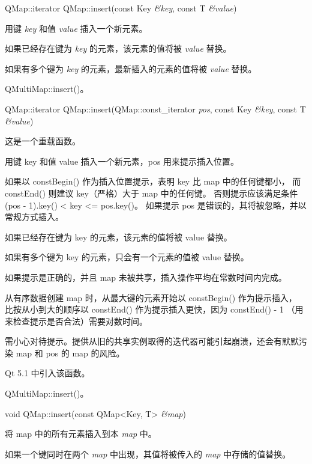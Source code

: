 \splitLine

QMap::iterator QMap::insert(const Key \emph{\&key}, const T \emph{\&value})

用键 \emph{key} 和值 \emph{value} 插入一个新元素。

如果已经存在键为 \emph{key} 的元素，该元素的值将被 \emph{value} 替换。

如果有多个键为 \emph{key} 的元素，最新插入的元素的值将被 \emph{value} 替换。

\begin{notice}[另请参阅]
QMultiMap::insert()。
\end{notice}

\splitLine

QMap::iterator QMap::insert(QMap::const\_iterator \emph{pos}, const Key \emph{\&key}, const T \emph{\&value})

这是一个重载函数。

用键 key 和值 value 插入一个新元素，pos 用来提示插入位置。

如果以 constBegin() 作为插入位置提示，表明 key 比 map 中的任何键都小，
而 constEnd() 则建议 key（严格）大于 map 中的任何键。
否则提示应该满足条件 (pos - 1).key() < key <= pos.key()。
如果提示 pos 是错误的，其将被忽略，并以常规方式插入。

如果已经存在键为 key 的元素，该元素的值将被 value 替换。

如果有多个键为 key 的元素，只会有一个元素的值被 value 替换。

如果提示是正确的，并且 map 未被共享，插入操作平均在常数时间内完成。

从有序数据创建 map 时，从最大键的元素开始以 constBegin() 作为提示插入，
比按从小到大的顺序以 constEnd() 作为提示插入更快，因为 constEnd() - 1 （用来检查提示是否合法）需要对数时间。

\begin{notice}
需小心对待提示。提供从旧的共享实例取得的迭代器可能引起崩溃，还会有默默污染 map 和 pos 的 map 的风险。
\end{notice}

Qt 5.1 中引入该函数。

\begin{notice}[另请参阅]
QMultiMap::insert()。
\end{notice}

\splitLine

void QMap::insert(const QMap<Key, T> \emph{\&map})

将 map 中的所有元素插入到本 \emph{map} 中。

如果一个键同时在两个 \emph{map} 中出现，其值将被传入的 \emph{map} 中存储的值替换。

